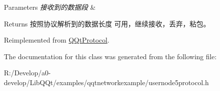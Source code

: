 \begin{DoxyParams}{Parameters}
{\em 接收到的数据段} & \\
\hline
\end{DoxyParams}
\begin{DoxyReturn}{Returns}
按照协议解析到的数据长度 可用，继续接收，丢弃，粘包。 
\end{DoxyReturn}


Reimplemented from \mbox{\hyperlink{class_q_qt_protocol_a00fd0c1ac23379ed3b9b25da9a34f39b}{Q\+Qt\+Protocol}}.



The documentation for this class was generated from the following file\+:\begin{DoxyCompactItemize}
\item 
R\+:/\+Develop/a0-\/develop/\+Lib\+Q\+Qt/examples/qqtnetworkexample/usernode5protocol.\+h\end{DoxyCompactItemize}
